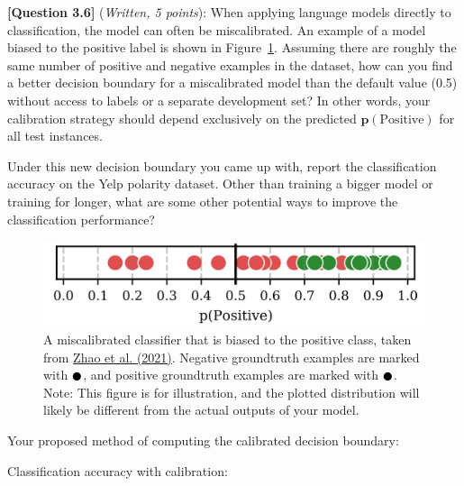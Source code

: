 \documentclass[leqno,12pt]{article}
\begin{document}
\noindent \textbf{[Question 3.6]} (\emph{Written, 5 points}): When applying language models directly to classification, the model can often be miscalibrated. An example of a model biased to the positive label is shown in Figure~\ref{miscalibrated}.
Assuming there are roughly the same number of positive and negative examples in the dataset, how can you find a better decision boundary for a miscalibrated model than the default value (0.5) without access to labels or a separate development set?
In other words, your calibration strategy should depend exclusively on the predicted $\mathbf{p}(\text{Positive})$ for all test instances.

Under this new decision boundary you came up with, report the classification accuracy on the Yelp polarity dataset.
Other than training a bigger model or training for longer, what are some other potential ways to improve the classification performance? \newline

\begin{figure}[h!]
    \centering
    \includegraphics[width=0.75\linewidth]{figures/fig4-q3.6-calibration.png}
    \caption{A miscalibrated classifier that is biased to the positive class, taken from \href{https://arxiv.org/abs/2102.09690}{Zhao et al. (2021)}.
    Negative groundtruth examples are marked with \textcolor{mred}{$\newmoon$}, and positive groundtruth examples are marked with \textcolor{mgreen}{$\newmoon$}.
    Note: This figure is for illustration, and the plotted distribution will likely be different from the actual outputs of your model.}
    \label{miscalibrated}
\end{figure}

\noindent
Your proposed method of computing the calibrated decision boundary:
\begin{tcolorbox}[fit,height=2cm, width=\linewidth, blank, borderline={1pt}{-2pt}]
\end{tcolorbox}


\noindent
Classification accuracy with calibration:
\begin{tcolorbox}[fit,height=1cm, width=4cm, blank, borderline={1pt}{-2pt}]
\end{tcolorbox}
\end{document}
